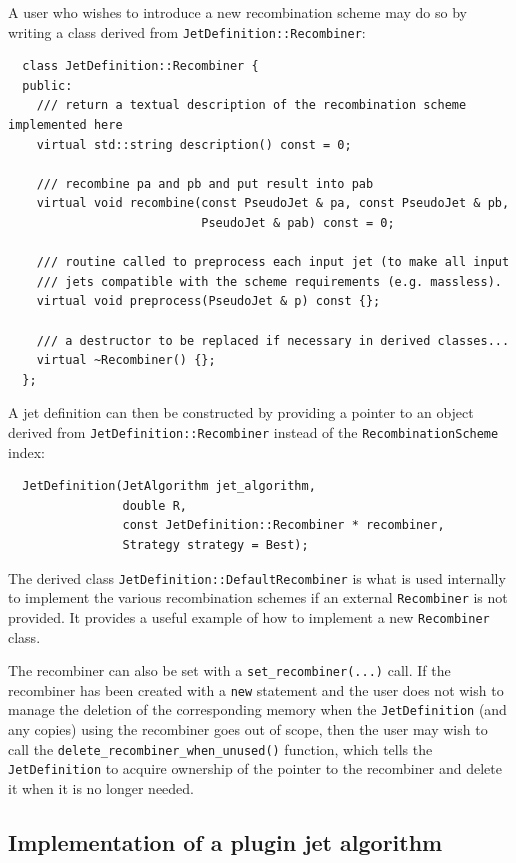 \documentclass[12pt,a4]{article}
\newcommand{\ttt}[1]{{\small\texttt{#1}}}
\begin{document}
A user who wishes to introduce a new recombination scheme may
do so by writing a class derived from \ttt{JetDefinition::Recombiner}:
\begin{lstlisting}
  class JetDefinition::Recombiner {
  public:
    /// return a textual description of the recombination scheme implemented here
    virtual std::string description() const = 0;
    
    /// recombine pa and pb and put result into pab
    virtual void recombine(const PseudoJet & pa, const PseudoJet & pb, 
                           PseudoJet & pab) const = 0;

    /// routine called to preprocess each input jet (to make all input
    /// jets compatible with the scheme requirements (e.g. massless).
    virtual void preprocess(PseudoJet & p) const {};
    
    /// a destructor to be replaced if necessary in derived classes...
    virtual ~Recombiner() {};
  };
\end{lstlisting}
A jet definition can then be constructed by providing a pointer to an
object derived from \ttt{JetDefinition::Recombiner} instead of the
\ttt{RecombinationScheme} index:
\begin{lstlisting}
  JetDefinition(JetAlgorithm jet_algorithm, 
                double R, 
                const JetDefinition::Recombiner * recombiner,
                Strategy strategy = Best);
\end{lstlisting}
%
The derived class \ttt{JetDefinition::DefaultRecombiner} is what is
used internally to implement the various recombination schemes if an
external \ttt{Recombiner} is not provided. It provides a useful
example of how to implement a new \ttt{Recombiner} class.
%

The recombiner can also be set with a \ttt{set\_recombiner(...)} call.
%
If the recombiner has been created with a \ttt{new} statement and the
user does not wish to manage the deletion of the corresponding memory
when the \ttt{JetDefinition} (and any copies) using the recombiner
goes out of scope, then the user may wish to call the
\ttt{delete\_recombiner\_when\_unused()} function, which tells the
\ttt{JetDefinition} to acquire ownership of the pointer to the
recombiner and delete it when it is no longer needed.





\subsection{Implementation of a plugin jet algorithm}
\label{sec:new-plugin}
\end{document}
